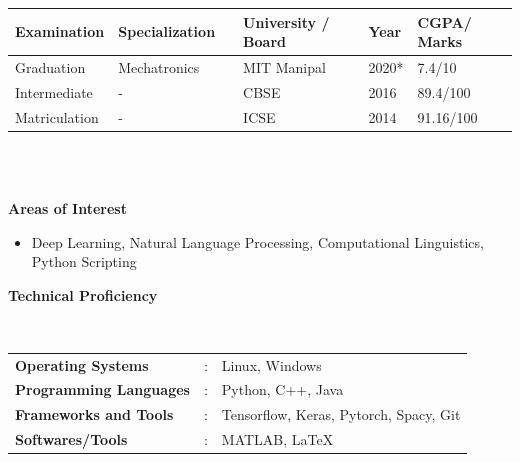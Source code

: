 \documentclass[a4paper,10pt]{article}
\begin{document}
\vspace{-.8cm}

\begin{tabularx}{.98\textwidth}{llp{2cm}lll}
    \hline
    \textbf{Examination} & \textbf{Specialization} & & \textbf{University / Board} & \textbf{Year} & \textbf{CGPA/ Marks}\\
    \hline
    Graduation & Mechatronics & & MIT Manipal & 2020* & 7.4/10\\
    Intermediate & - & & CBSE & 2016 & 89.4/100 \\
    Matriculation & - & & ICSE & 2014 & 91.16/100 \\
    \hline
\end{tabularx}
\\\\


\colorbox{titleColor}{\parbox{6.7in}{\textbf{Areas of Interest}}}
\begin{itemize}
  \setlength{\itemsep}{1pt}
  \item {{Deep Learning, Natural Language Processing, Computational Linguistics,
  Python Scripting}}
 \end{itemize} 

\colorbox{titleColor}{\parbox{6.7in}{\textbf{Technical Proficiency}}}\\

\begin{tabular}{p{1.6in}p{0.1in}p{4.5in}}
  \textbf{\small{Operating Systems}} &: &{{Linux, Windows}} \\
  \textbf{\small{Programming Languages}} &: &{{Python, C++, Java}} \\
  \textbf{\small{Frameworks and Tools}} &: &{{Tensorflow, Keras, Pytorch, Spacy, Git}} \\
  \textbf{\small{Softwares/Tools}} &: &{{MATLAB, \LaTeX}} \\
\end{tabular}
\end{document}
